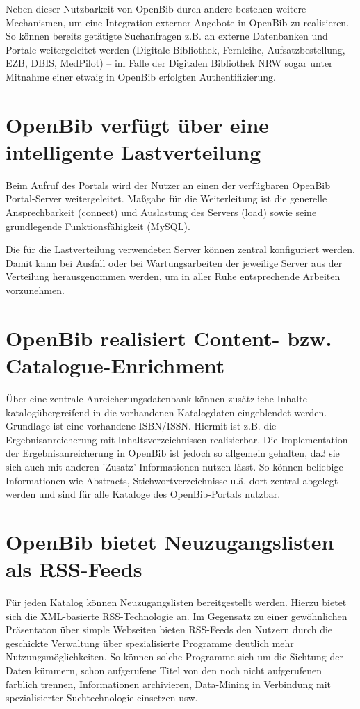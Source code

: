 \documentclass[11pt, twoside, a4paper, BCOR8mm, DIV12, bibtotoc,idxtotoc]{scrbook}
\begin{document}
Neben dieser Nutzbarkeit von OpenBib durch andere bestehen weitere
Mechanismen, um eine Integration externer Angebote in OpenBib zu
realisieren. So können bereits getätigte Suchanfragen z.B. an
externe Datenbanken und Portale weitergeleitet werden (Digitale
Bibliothek, Fernleihe, Aufsatzbestellung, EZB, DBIS, MedPilot) -- im
Falle der Digitalen Bibliothek NRW sogar unter Mitnahme einer etwaig
in OpenBib erfolgten Authentifizierung.

\section{OpenBib verfügt über eine intelligente Lastverteilung}
Beim Aufruf des Portals wird der Nutzer an einen der verfügbaren
OpenBib Portal-Server weitergeleitet. Maßgabe für die Weiterleitung
ist die generelle Ansprechbarkeit (connect) und Auslastung des Servers
(load) sowie seine grundlegende Funktionsfähigkeit (MySQL).

Die für die Lastverteilung verwendeten Server können zentral
konfiguriert werden. Damit kann bei Ausfall oder bei
Wartungsarbeiten der jeweilige Server aus der Verteilung
herausgenommen werden, um in aller Ruhe entsprechende Arbeiten
vorzunehmen.

\section{OpenBib realisiert Content- bzw. Catalogue-Enrichment}
Über eine zentrale Anreicherungsdatenbank können zusätzliche
Inhalte katalogübergreifend in die vorhandenen Katalogdaten
eingeblendet werden. Grundlage ist eine vorhandene ISBN/ISSN. Hiermit
ist z.B. die Ergebnisanreicherung mit Inhaltsverzeichnissen
realisierbar. Die Im\-ple\-men\-ta\-tion der Ergebnisanreicherung in OpenBib
ist jedoch so allgemein gehalten, daß sie sich auch mit anderen
'Zusatz'-Informationen nutzen lässt. So können beliebige
Informationen wie Abstracts, Stichwortverzeichnisse u.ä. dort zentral
abgelegt werden und sind für alle Kataloge des OpenBib-Portals
nutzbar.

\section{OpenBib bietet Neuzugangslisten als RSS-Feeds}
Für jeden Katalog können Neuzugangslisten bereitgestellt werden.
Hierzu bietet sich die XML-basierte RSS-Technologie an. Im Gegensatz
zu einer gewöhnlichen Präsentaton über simple Webseiten bieten
RSS-Feeds den Nutzern durch die geschickte Verwaltung über
spezialisierte Programme deutlich mehr Nutzungsmöglichkeiten. So
können solche Programme sich um die Sichtung der Daten kümmern,
schon aufgerufene Titel von den noch nicht aufgerufenen farblich
trennen, Informationen archivieren, Data-Mining in Verbindung mit
spezialisierter Such\-tech\-no\-lo\-gie einsetzen usw.
\end{document}

